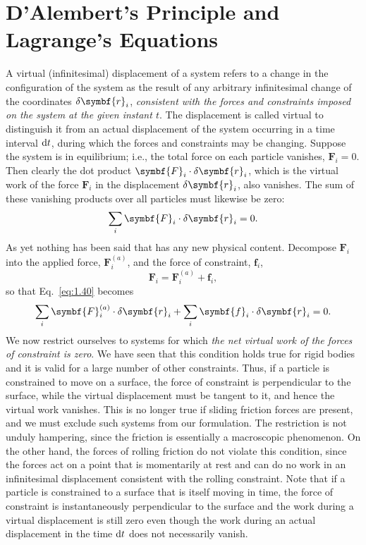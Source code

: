 \section{D'Alembert's Principle and Lagrange's Equations}

A virtual (infinitesimal) displacement of a system refers to a change in the configuration of the system as the result of any arbitrary infinitesimal change of the coordinates \(\fdif{\symbf{r}_i}\), \emph{consistent with the forces and constraints imposed on the system at the given instant \(t\)}. The displacement is called virtual to distinguish it from an actual displacement of the system occurring in a time interval \(\odif{t}\), during which the forces and constraints may be changing. Suppose the system is in equilibrium; i.e., the total force on each particle vanishes, \(\symbf{F}_i=0\). Then clearly the dot product \(\symbf{F}_i\cdot\fdif{\symbf{r}_i}\), which is the virtual work of the force \(\symbf{F}_i\) in the displacement \(\fdif{\symbf{r}_i}\), also vanishes. The sum of these vanishing products over all particles must likewise be zero:
\begin{equation}
    \sum_i\symbf{F}_i\cdot\fdif{\symbf{r}_i}=0.\label{eq:1.40}
\end{equation}
As yet nothing has been said that has any new physical content. Decompose \(\symbf{F}_i\) into the applied force, \(\symbf{F}_i^{\left(a\right)}\), and the force of constraint, \(\symbf{f}_i\),
\begin{equation}
    \symbf{F}_i=\symbf{F}_i^{\left(a\right)}+\symbf{f}_i,
\end{equation}
so that Eq.~\eqref{eq:1.40} becomes
\begin{equation}
    \sum_i\symbf{F}_i^{\left(a\right)}\cdot\fdif{\symbf{r}_i}+\sum_i\symbf{f}_i\cdot\fdif{\symbf{r}_i}=0.
\end{equation}
We now restrict ourselves to systems for which \emph{the net virtual work of the forces of constraint is zero}. We have seen that this condition holds true for rigid bodies and it is valid for a large number of other constraints. Thus, if a particle is constrained to move on a surface, the force of constraint is perpendicular to the surface, while the virtual displacement must be tangent to it, and hence the virtual work vanishes. This is no longer true if sliding friction forces are present, and we must exclude such systems from our formulation. The restriction is not unduly hampering, since the friction is essentially a macroscopic phenomenon. On the other hand, the forces of rolling friction do not violate this condition, since the forces act on a point that is momentarily at rest and can do no work in an infinitesimal displacement consistent with the rolling constraint. Note that if a particle is constrained to a surface that is itself moving in time, the force of constraint is instantaneously perpendicular to the surface and the work during a virtual displacement is still zero even though the work during an actual displacement in the time \(\odif{t}\) does not necessarily vanish.

